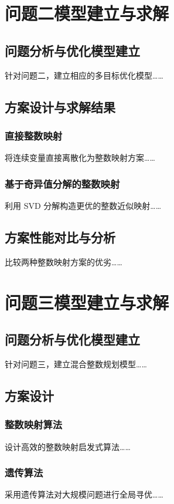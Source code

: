 \documentclass[bwprint]{gmcmthesis}
\begin{document}
\clearpage
\section{问题二模型建立与求解}

\subsection{问题分析与优化模型建立}
针对问题二，建立相应的多目标优化模型……

\subsection{方案设计与求解结果}

\subsubsection{直接整数映射}
将连续变量直接离散化为整数映射方案……

\subsubsection{基于奇异值分解的整数映射}
利用 SVD 分解构造更优的整数近似映射……

\subsection{方案性能对比与分析}
比较两种整数映射方案的优劣……

\clearpage
\section{问题三模型建立与求解}

\subsection{问题分析与优化模型建立}
针对问题三，建立混合整数规划模型……

\subsection{方案设计}

\subsubsection{整数映射算法}
设计高效的整数映射启发式算法……

\subsubsection{遗传算法}
采用遗传算法对大规模问题进行全局寻优……
\end{document}
